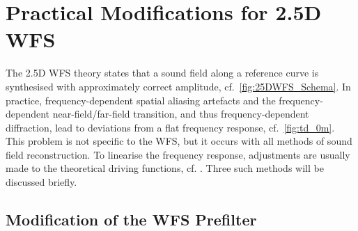 \section{Practical Modifications for 2.5D WFS}
\label{sec:mods_25d_wfs}

The 2.5D WFS theory states that a sound field along a reference curve
is synthesised with approximately correct amplitude,
cf.~\myfig\ref{fig:25DWFS_Schema}.
%
In practice, frequency-dependent spatial aliasing artefacts and the
frequency-dependent near-field/far-field transition, and thus
frequency-dependent diffraction,
lead to deviations from a flat frequency response, cf.~\myfig\ref{fig:td_0m}.
%
This problem is not specific to the WFS, but it occurs with all methods
of sound field reconstruction.
%
To linearise the frequency response, adjustments are usually made to the
theoretical driving functions, cf. \cite{Apel2004,Kolundzija2009b,Spors2010a}.
Three such methods will be discussed briefly.



\subsection{Modification of the WFS Prefilter}



